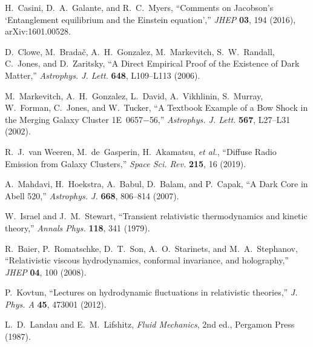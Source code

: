 \documentclass[aps,prd,onecolumn,superscriptaddress,nofootinbib]{revtex4-2}
\begin{document}
\begin{thebibliography}{99}
H.~Casini, D.~A.~Galante, and R.~C.~Myers,
``Comments on Jacobson's `Entanglement equilibrium and the Einstein equation',''
\emph{JHEP} \textbf{03}, 194 (2016), arXiv:1601.00528.

D.~Clowe, M.~Brada\v{c}, A.~H.~Gonzalez, M.~Markevitch, S.~W.~Randall, C.~Jones, and D.~Zaritsky,
``A Direct Empirical Proof of the Existence of Dark Matter,''
\emph{Astrophys. J. Lett.} \textbf{648}, L109–L113 (2006).

M.~Markevitch, A.~H.~Gonzalez, L.~David, A.~Vikhlinin, S.~Murray, W.~Forman, C.~Jones, and W.~Tucker,
``A Textbook Example of a Bow Shock in the Merging Galaxy Cluster 1E~0657$-$56,''
\emph{Astrophys. J. Lett.} \textbf{567}, L27–L31 (2002).

R.~J.~van Weeren, M.~de~Gasperin, H.~Akamatsu, \emph{et al.},
``Diffuse Radio Emission from Galaxy Clusters,''
\emph{Space Sci. Rev.} \textbf{215}, 16 (2019).

A.~Mahdavi, H.~Hoekstra, A.~Babul, D.~Balam, and P.~Capak,
``A Dark Core in Abell 520,''
\emph{Astrophys. J.} \textbf{668}, 806–814 (2007).

W.~Israel and J.~M.~Stewart,
``Transient relativistic thermodynamics and kinetic theory,''
\emph{Annals Phys.} \textbf{118}, 341 (1979).

R.~Baier, P.~Romatschke, D.~T.~Son, A.~O.~Starinets, and M.~A.~Stephanov,
``Relativistic viscous hydrodynamics, conformal invariance, and holography,''
\emph{JHEP} \textbf{04}, 100 (2008).

P.~Kovtun,
``Lectures on hydrodynamic fluctuations in relativistic theories,''
\emph{J. Phys. A} \textbf{45}, 473001 (2012).

L.~D.~Landau and E.~M.~Lifshitz,
\emph{Fluid Mechanics}, 2nd ed., Pergamon Press (1987).

\end{thebibliography}

\iffalse
\section*{Submission Cover Letter}
[Omitted in manuscript PDF.]
\fi
\end{document}
